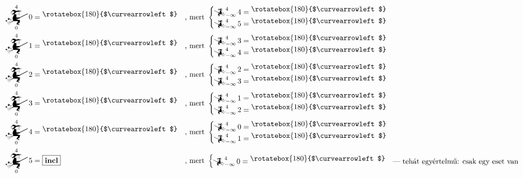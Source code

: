 \documentclass{article}
\newcommand{\nothing}{\text{\raisebox{0.4em}{\rotatebox{180}{$\curvearrowleft$}}}}%
\newcommand{\just}[1]{\boxed{#1}}%
\newcommand{\incl}{\mathbf{incl}}
\newcommand{\mainfunA}[3]{\mathwitch_{#2}^{#1}#3}
\newcommand{\mainfunB}[3]{\reversemathwitch_{#2}^{#1}#3}
\begin{document}
	\begin{align*}
		\mainfunA4{0}0  &= \nothing    &&\text{, mert }\begin{cases}\mainfunB4{-\infty}4 = \nothing\\\mainfunB4{-\infty}5 = \nothing&\end{cases} \\
		\mainfunA4{0}1  &= \nothing    &&\text{, mert }\begin{cases}\mainfunB4{-\infty}3 = \nothing\\\mainfunB4{-\infty}4 = \nothing&\end{cases} \\
		\mainfunA4{0}2  &= \nothing    &&\text{, mert }\begin{cases}\mainfunB4{-\infty}2 = \nothing\\\mainfunB4{-\infty}3 = \nothing&\end{cases} \\
		\mainfunA4{0}3  &= \nothing    &&\text{, mert }\begin{cases}\mainfunB4{-\infty}1 = \nothing\\\mainfunB4{-\infty}2 = \nothing&\end{cases} \\
		\mainfunA4{0}4  &= \nothing    &&\text{, mert }\begin{cases}\mainfunB4{-\infty}0 = \nothing\\\mainfunB4{-\infty}1 = \nothing&\end{cases} \\
		\mainfunA4{0}5  &= \just \incl &&\text{, mert }\begin{cases}\mainfunB4{-\infty}0 = \nothing&\text{--- tehát egyértelmű: csak egy eset van}\end{cases}
	\end{align*}
\end{document}
